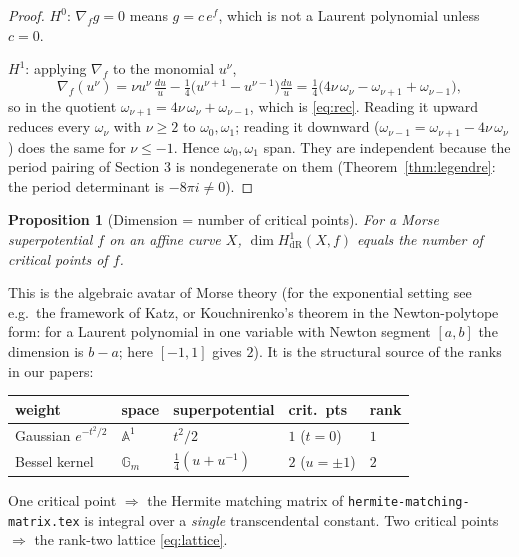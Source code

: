 \documentclass[11pt]{article}
\newtheorem{proposition}{Proposition}[section]
\theoremstyle{definition}
\theoremstyle{remark}
\newcommand{\Gm}{\mathbb{G}_m}
\newcommand{\dR}{\mathrm{dR}}
\begin{document}
\begin{proof}
$H^0$: $\nabla_f g = 0$ means $g = c\,e^{f}$, which is not a
Laurent polynomial unless $c = 0$.

$H^1$: applying $\nabla_f$ to the monomial $u^\nu$,
\[
  \nabla_f(u^\nu)
  = \nu u^\nu\,\tfrac{du}{u}
    - \tfrac14\bigl(u^{\nu+1} - u^{\nu-1}\bigr)\tfrac{du}{u}
  = \tfrac14\bigl(4\nu\,\omega_\nu - \omega_{\nu+1}
    + \omega_{\nu-1}\bigr),
\]
so in the quotient $\omega_{\nu+1} = 4\nu\,\omega_\nu +
\omega_{\nu-1}$, which is \eqref{eq:rec}. Reading it upward reduces
every $\omega_\nu$ with $\nu \ge 2$ to $\omega_0, \omega_1$;
reading it downward ($\omega_{\nu-1} = \omega_{\nu+1} -
4\nu\,\omega_\nu$) does the same for $\nu \le -1$. Hence
$\omega_0, \omega_1$ span. They are independent because the period
pairing of Section 3 is nondegenerate on them
(Theorem~\ref{thm:legendre}: the period determinant is $-8\pi i
\ne 0$).
\end{proof}

\begin{proposition}[Dimension = number of critical points]
For a Morse superpotential $f$ on an affine curve $X$,
$\dim H^1_{\dR}(X, f)$ equals the number of critical points of $f$.
\end{proposition}

This is the algebraic avatar of Morse theory (for the exponential
setting see e.g.\ the framework of Katz, or
Kouchnirenko's theorem in the Newton-polytope form: for a Laurent
polynomial in one variable with Newton segment $[a,b]$ the
dimension is $b - a$; here $[-1,1]$ gives $2$). It is the
structural source of the ranks in our papers:

\begin{center}
\begin{tabular}{lllll}
\toprule
weight & space & superpotential & crit.\ pts & rank \\
\midrule
Gaussian $e^{-t^2/2}$ & $\mathbb A^1$ & $t^2/2$ & $1$ ($t=0$) & $1$ \\
Bessel kernel & $\Gm$ & $\tfrac14(u+u^{-1})$ & $2$ ($u=\pm1$) & $2$ \\
\bottomrule
\end{tabular}
\end{center}

One critical point $\Rightarrow$ the Hermite matching matrix of
\texttt{hermite-matching-matrix.tex} is integral over a
\emph{single} transcendental constant. Two critical points
$\Rightarrow$ the rank-two lattice \eqref{eq:lattice}.
\end{document}
